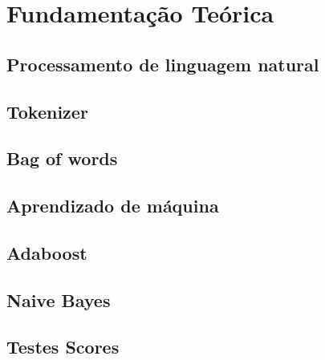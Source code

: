 \chapter{Fundamentação Teórica}\label{fund_teo}

\section{Processamento de linguagem natural}


\section{Tokenizer}
\section{Bag of words}
\section{Aprendizado de máquina}
\section{Adaboost}
\section{Naive Bayes}
\section{Testes Scores}

